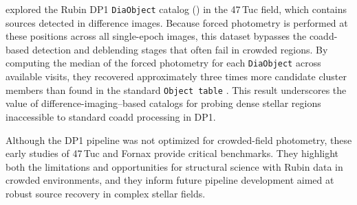 \citet{Wainer2025} explored the Rubin DP1 \texttt{DiaObject} catalog () in the 47\,Tuc field, which contains sources detected in difference images. 
Because forced photometry is performed at these positions across all single-epoch images, this dataset bypasses the coadd-based detection and deblending stages that often fail in crowded regions. 
By computing the median of the forced photometry for each  \texttt{DiaObject} across available visits, they recovered approximately three times more candidate cluster members than found in the standard \texttt{Object table} \citep{Choi2025}. 
This result underscores the value of difference-imaging–based catalogs for probing dense stellar regions inaccessible to standard coadd processing in DP1.

Although the DP1 pipeline was not optimized for crowded-field photometry, these early studies of 47\,Tuc and Fornax provide critical benchmarks. 
They highlight both the limitations and opportunities for structural science with Rubin data in crowded environments, and they inform future pipeline development aimed at robust source recovery in complex stellar fields.
